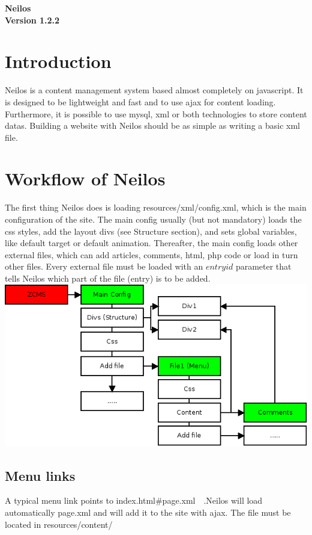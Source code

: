 \documentclass[a4paper,12pt]{article}
\begin{document}
\begin{center}
 \huge \bfseries {Neilos}\\
 \normalfont \normalsize Version 1.2.2
\\[0.5cm]
\end{center}
\tableofcontents
\newpage
\section{Introduction}
Neilos is a content management system based almost completely on javascript. It is designed to be lightweight and fast and to use ajax for content loading. Furthermore, it is possible to use mysql, xml or both technologies to store content datas. Building a website with Neilos should be as simple as writing a basic xml file.
\section{Workflow of Neilos}
The first thing Neilos does is loading resources/xml/config.xml, which is the main configuration of the site. The main config usually (but not mandatory) loads the css styles, add the layout divs (see Structure section), and sets global variables, like default target or default animation. Thereafter, the main config loads other external files, which can add articles, comments, html, php code or load in turn other files. Every external file must be loaded with an $entryid$ parameter that tells Neilos which part of the file (entry) is to be added. \\
\includegraphics[scale=0.7]{Diagramma_neilos.png} 
\subsection{Menu links}
A typical menu link points to index.html\#page.xml\ \ .Neilos will load automatically page.xml and will add it to the site with ajax. The file must be located in resources/content/
\end{document}

